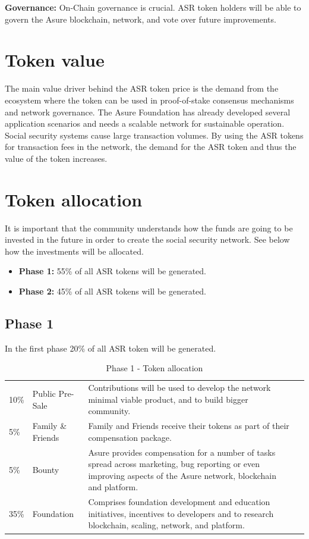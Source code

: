 \textbf{Governance:}
On-Chain governance is crucial. ASR token holders will be able to govern the Asure blockchain, network, and vote over future improvements.
\newline\newline

\section{Token value}
The main value driver behind the ASR token price is the demand from the ecosystem where the token can be used in proof-of-stake consensus mechanisms and network governance. The Asure Foundation has already developed several application scenarios and needs a scalable network for sustainable operation. Social security systems cause large transaction volumes. By using the ASR tokens for transaction fees in the network, the demand for the ASR token and thus the value of the token increases.


\section{Token allocation}

It is important that the community understands how the funds are going to be invested in the future in order to create the social security network. See below how the investments will be allocated.

\begin{itemize}
\item \textbf{Phase 1:} 55\% of all ASR tokens will be generated.
\item \textbf{Phase 2:} 45\% of all ASR tokens will be generated.
\end{itemize}

\subsection{Phase 1}

In the first phase 20\% of all ASR token will be generated.

\begin{table}[H]
\begin{tabular}{llp{}l}
  10\% & Public Pre-Sale & Contributions will be used to develop the network minimal viable product, and to build bigger community.\\
  5\% & Family \& Friends & Family and Friends receive their tokens as part of their compensation package.\\
  5\% & Bounty & Asure provides compensation for a number of tasks spread across marketing, bug reporting or even improving aspects of the Asure network, blockchain and platform.\\
  35\% & Foundation & Comprises foundation development and education initiatives, incentives to developers and to research blockchain, scaling, network, and platform.
\end{tabular}
\caption{\label{tab:table-name} Phase 1 - Token allocation}
\end{table}

